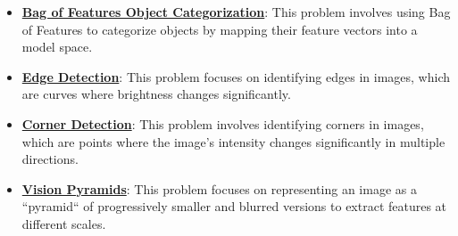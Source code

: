 \documentclass{article}%
\begin{document}
\begin{itemize}[leftmargin=*]%
\item \href{https://purdue.brightspace.com/d2l/common/assets/pdfjs-d2l-dist/1.0.14-legacy/web/viewer.html?file=\%2Fcontent\%2Fenforced\%2F1095467-wl.202510.CS.24300.001\%2F08L2-Feature Extraction.pdf\%3Fou\%3D1095467\&lang=en-us\&container=d2l-fileviewer-rendered-pdf\&fullscreen=d2l-fileviewer-rendered-pdf-dialog\&height=667#page=3}{\textbf{Bag of Features Object Categorization}}: This problem involves using Bag of Features to categorize objects by mapping their feature vectors into a model space.%
\item \href{https://purdue.brightspace.com/d2l/common/assets/pdfjs-d2l-dist/1.0.14-legacy/web/viewer.html?file=\%2Fcontent\%2Fenforced\%2F1095467-wl.202510.CS.24300.001\%2F08L2-Feature Extraction.pdf\%3Fou\%3D1095467\&lang=en-us\&container=d2l-fileviewer-rendered-pdf\&fullscreen=d2l-fileviewer-rendered-pdf-dialog\&height=667#page=4}{\textbf{Edge Detection}}: This problem focuses on identifying edges in images, which are curves where brightness changes significantly.%
\item \href{https://purdue.brightspace.com/d2l/common/assets/pdfjs-d2l-dist/1.0.14-legacy/web/viewer.html?file=\%2Fcontent\%2Fenforced\%2F1095467-wl.202510.CS.24300.001\%2F08L2-Feature Extraction.pdf\%3Fou\%3D1095467\&lang=en-us\&container=d2l-fileviewer-rendered-pdf\&fullscreen=d2l-fileviewer-rendered-pdf-dialog\&height=667#page=20}{\textbf{Corner Detection}}: This problem involves identifying corners in images, which are points where the image's intensity changes significantly in multiple directions.%
\item \href{https://purdue.brightspace.com/d2l/common/assets/pdfjs-d2l-dist/1.0.14-legacy/web/viewer.html?file=\%2Fcontent\%2Fenforced\%2F1095467-wl.202510.CS.24300.001\%2F08L2-Feature Extraction.pdf\%3Fou\%3D1095467\&lang=en-us\&container=d2l-fileviewer-rendered-pdf\&fullscreen=d2l-fileviewer-rendered-pdf-dialog\&height=667#page=30}{\textbf{Vision Pyramids}}: This problem focuses on representing an image as a ``pyramid`` of progressively smaller and blurred versions to extract features at different scales.%
\end{itemize}%
\end{document}

